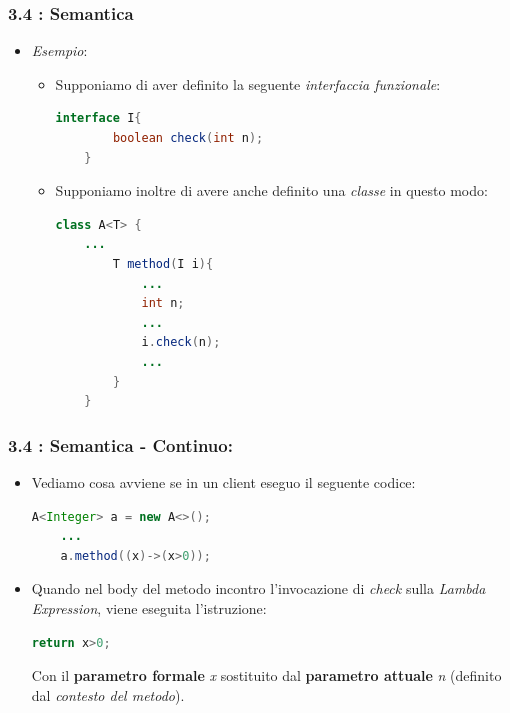 \documentclass{beamer}
\begin{document}

\begin{frame}[fragile]
	\frametitle{\textbf{3.4 : Semantica}}
	\begin{itemize}
		\item
			\textit{Esempio}: 
			\begin{itemize}
				\item
					Supponiamo di aver definito la seguente \textit{interfaccia funzionale}:
\begin{lstlisting}[language=Java]
	interface I{
		boolean check(int n);
	}
\end{lstlisting}
				\item
					Supponiamo inoltre di avere anche definito una \textit{classe} in questo modo:
\begin{lstlisting}[language=Java]
	class A<T> {
	...
		T method(I i){
			...
			int n;
			...
			i.check(n);
			...
		}
	}
\end{lstlisting}
			\end{itemize}
	\end{itemize}
\end{frame}


\begin{frame}[fragile]
	\frametitle{\textbf{3.4 : Semantica - Continuo:}}
	\begin{itemize}
		\item	
			Vediamo cosa avviene se in un client eseguo il seguente codice:
\begin{lstlisting}[language=Java]
	A<Integer> a = new A<>();
	...
	a.method((x)->(x>0));
\end{lstlisting}
		\item
			Quando nel body del metodo incontro l'invocazione di \textit{check} sulla \textit{Lambda Expression}, viene eseguita l'istruzione:
\begin{lstlisting}[language=Java]
	return x>0;
\end{lstlisting}
			Con il \textbf{parametro formale} \textit{x} sostituito dal \textbf{parametro attuale} \textit{n} (definito dal \textit{contesto del metodo}).
	\end{itemize}
\end{frame}

\end{document}
